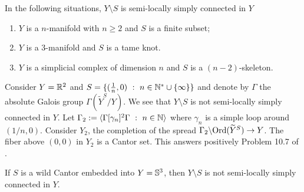 \begin{ex}  In the following situations,  $Y\setminus S$ is semi-locally simply connected in $Y$ 
\begin{enumerate}
 \item $Y$ is a $n$-manifold with $n\geq 2$ and $S$ is a finite subset;
 \item $Y$ is a 3-manifold and $S$ is a tame knot.
 \item $Y$ is a simplicial complex of dimension $n$ and $S$ is a $(n-2)$-skeleton.
\end{enumerate}

 
\end{ex}

\begin{ex} Consider $Y = \mathbb R^2$ and $S=\{(\frac{1}{n},0)~:~n\in \mathbb{N}^*\cup\{\infty\}\}$ and denote by $\Gamma$ the absolute Galois group $\Gamma(\widetilde Y^S/Y)$. We see that $Y\setminus S$ is not semi-locally simply connected in $Y$.  
Let $\Gamma_2:=\langle \Gamma[\gamma_n]^2\Gamma~:~ n\in \mathbb{N} \rangle$ where $\gamma_n$ is a simple loop around $(1/n,0)$. Consider $Y_2$, the completion of the spread $\Gamma_2\backslash\mathrm{Ord}(\widetilde Y^S) \rightarrow Y$.
The fiber above $(0,0)$ in  $Y_2$ is  a Cantor set. This answers positively Problem 10.7 of \cite{MR2198590}. 


\end{ex}


\begin{ex} If $S$ is a  wild Cantor \cite{general_antoine} embedded into $Y = \mathbb{S}^3$, then $Y\setminus S$ is not semi-locally simply connected in $Y$.
\end{ex}



